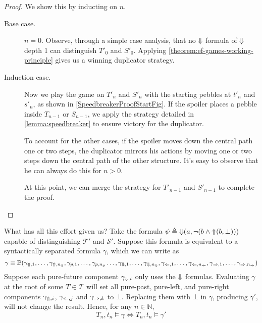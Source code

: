 \documentclass[a4paper,UKenglish,cleveref, autoref, thm-restate, numberwithinsect]{lipics-v2021}
\def\Larrow{\ensuremath\mathord{\Leftarrow}}
\def\Rarrow{\ensuremath\mathord{\Rightarrow}}
\def\Uarrow{\ensuremath\mathord{\Uparrow}}
\def\Darrow{\ensuremath\mathord{\Downarrow}}
\begin{document}
\begin{proof}
     We show this by inducting on $n$. %
    \begin{description}
        \item[Base case.] $n = 0$.
            Observe, through a simple case analysis, that no $\Darrow$ formula of $\Darrow$ depth 1 can distinguish $T'_0$ and $S'_0$. Applying \cref{theorem:ef-games-working-principle} gives us a winning duplicator strategy.
        \item[Induction case.]
            Now we play the game on $T'_n$ and $S'_n$ with the starting pebbles at $t'_n$ and $s'_n$, as shown in \cref{SpeedbreakerProofStartFig}. If the spoiler places a pebble inside $T_{n-1}$ or $S_{n-1}$, we apply the strategy detailed in \cref{lemma:speedbreaker} to ensure victory for the duplicator.

            To account for the other cases, if the spoiler moves down the central path one or two steps, the duplicator mirrors his actions by moving one or two steps down the central path of the other structure. It's easy to observe that he can always do this for $n > 0$.

            At this point, we can merge the strategy for $T'_{n-1}$ and $S'_{n-1}$ to complete the proof.
    \end{description}
\end{proof}
What has all this effort given us? Take the formula $\psi \triangleq \Darrow(a, \lnot(b \land \Uarrow(b, \bot)))$ capable of distinguishing $\mathcal{T}'$ and $\mathcal{S}'$. Suppose this formula is equivalent to a syntactically separated formula $\gamma$, which we can write as
\begin{equation*}
    \gamma \equiv \mathbb{B}(\gamma_{\Uarrow, 1}, \ldots, \gamma_{\Uarrow, n_{\Uarrow}}, \gamma_{p, 1}, \ldots, \gamma_{p, n_p} \ldots, \gamma_{\Darrow, 1}, \ldots, \gamma_{\Darrow, n_{\Darrow}}, \gamma_{\Larrow, 1}, \ldots, \gamma_{\Larrow, n_{\Larrow}}, \gamma_{\Rarrow, 1}, \ldots, \gamma_{\Rarrow, n_{\Rarrow}})
\end{equation*}
Suppose each pure-future component $\gamma_{\Darrow, i}$ only uses the $\Darrow$ formulas. Evaluating $\gamma$ at the root of some $T \in \mathcal{T}$ will set all pure-past, pure-left, and pure-right components $\gamma_{\Uarrow, i}$, $\gamma_{\Larrow, j}$ and $\gamma_{\Rarrow, k}$ to $\bot$. Replacing them with $\bot$ in $\gamma$, producing $\gamma'$, will not change the result. Hence, for any $n \in \mathbb{N}$,
\begin{equation*}
    T_n, t_n \vDash \gamma \Longleftrightarrow T_n, t_n \vDash \gamma'
\end{equation*}
\end{document}
